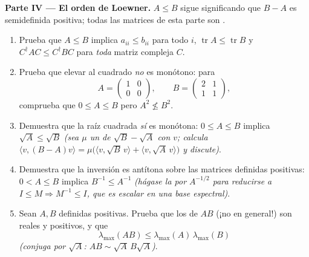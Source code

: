 \begin{problem}
\medskip
\noindent\textbf{Parte IV --- El orden de Loewner.} $A \leq B$ sigue
significando que $B - A$ es semidefinida positiva; todas las matrices
de esta parte son .
\begin{enumerate}[resume]
  \item Prueba que $A \leq B$ implica $a_{ii} \leq b_{ii}$ para todo
        $i$, $\operatorname{tr} A \leq \operatorname{tr} B$ y
        $C^\dagger AC \leq C^\dagger BC$ para \emph{toda} matriz
        compleja $C$.
  \item Prueba que elevar al cuadrado \emph{no} es monótono: para
        \[
        A = \begin{pmatrix} 1 & 0\\ 0 & 0\end{pmatrix},
        \qquad
        B = \begin{pmatrix} 2 & 1\\ 1 & 1\end{pmatrix},
        \]
        comprueba que $0 \leq A \leq B$ pero $A^2 \not\leq B^2$.
  \item Demuestra que la raíz cuadrada \emph{sí} es monótona: $0
        \leq A \leq B$ implica $\sqrt A \leq \sqrt B$ \emph{(sea
        $\mu$ un  de $\sqrt B - \sqrt A$ con
          $v$; calcula $\langle v, (B -
        A)v\rangle = \mu\bigl(\langle v, \sqrt B\,v\rangle + \langle
        v, \sqrt A\,v\rangle\bigr)$ y discute)}.
  \item Demuestra que la inversión es antítona sobre las matrices
        definidas positivas: $0 < A \leq B$ implica $B^{-1} \leq
        A^{-1}$ \emph{(hágase la  por $A^{-1/2}$ para
        reducirse a $I \leq M \Rightarrow M^{-1} \leq I$, que es
        escalar en una base espectral)}.
  \item Sean $A, B$ definidas positivas. Prueba que los
         de $AB$ (¡no  en general!) son
        reales y positivos, y que
        \[
        \lambda_{\max}(AB) \leq
        \lambda_{\max}(A)\,\lambda_{\max}(B)
        \]
        \emph{(conjuga por $\sqrt A$: $AB \sim \sqrt A\,B\sqrt
        A$)}.
\end{enumerate}


\end{problem}
